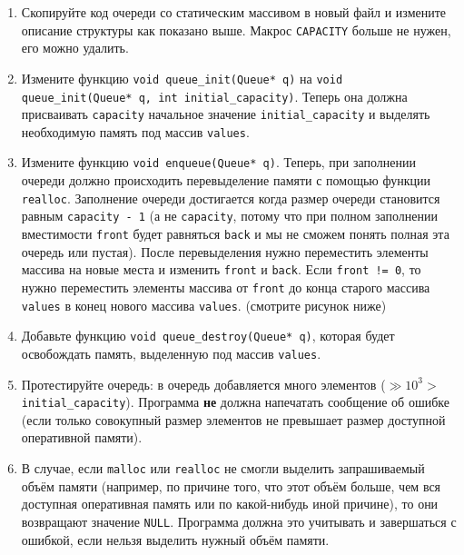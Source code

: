\documentclass{article}
\begin{document}
\begin{enumerate}
\item Скопируйте код очереди со статическим массивом в новый файл и измените описание структуры как показано выше. Макрос \texttt{CAPACITY} больше не нужен, его можно удалить.

\item Измените функцию \texttt{void queue\_init(Queue* q)} на \texttt{void queue\_init(Queue* q, int initial\_capacity)}. Теперь она должна присваивать \texttt{capacity} начальное значение \texttt{initial\_capacity} и выделять необходимую память под массив \texttt{values}.

\item Измените функцию \texttt{void enqueue(Queue* q)}. Теперь, при заполнении очереди должно происходить перевыделение памяти с помощью функции \texttt{realloc}. Заполнение очереди достигается когда размер очереди становится равным \texttt{capacity - 1} (а не \texttt{capacity}, потому что при полном заполнении вместимости \texttt{front} будет равняться \texttt{back} и мы не сможем понять полная эта очередь или пустая).
После перевыделения нужно переместить элементы массива на новые места и изменить \texttt{front} и \texttt{back}. Если \texttt{front != 0}, то нужно переместить элементы массива от \texttt{front} до конца старого массива \texttt{values} в конец нового массива \texttt{values}. (смотрите рисунок ниже)

\item Добавьте функцию \texttt{void queue\_destroy(Queue* q)}, которая будет освобождать память, выделенную под массив \texttt{values}.

\item Протестируйте очередь: в очередь добавляется много элементов ($\gg 10^3 >$ \texttt{initial\_capacity}). Программа \textbf{не} должна напечатать сообщение об ошибке (если только совокупный размер элементов не превышает размер доступной оперативной памяти). 

\item В случае, если \texttt{malloc} или \texttt{realloc} не смогли выделить запрашиваемый объём памяти (например, по причине того, что этот объём  больше, чем вся доступная оперативная память или по какой-нибудь иной причине), то они возвращают значение \texttt{NULL}. Программа должна это учитывать и завершаться с ошибкой, если нельзя выделить нужный объём памяти.
\end{enumerate}
\end{document}
